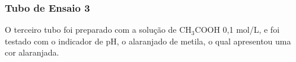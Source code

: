 	\subsubsection{Tubo de Ensaio 3}
        \indent O terceiro tubo foi preparado com a solução de CH$_3$COOH 0,1 mol/L, e foi testado com o indicador de pH, o alaranjado de metila, o qual apresentou uma cor alaranjada.

        \begin{figure}[h]
            \centering
            \qquad

\end{figure}
